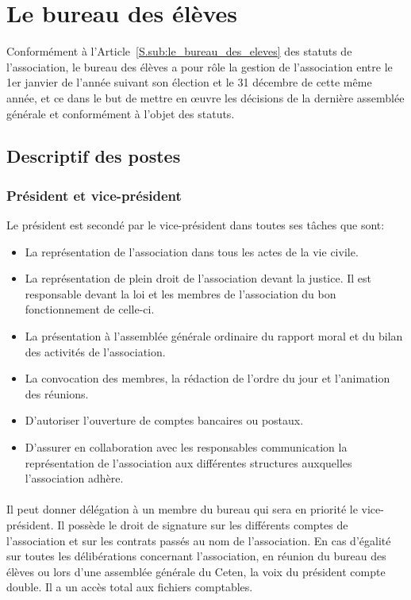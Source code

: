 \documentclass{article} %
\begin{document}
	\section{Le bureau des élèves}
\label{sec:le_bureau_des_eleves}

			Conformément à l’Article~\ref{S.sub:le_bureau_des_eleves} des
			statuts de l’association, le bureau des élèves a pour rôle la
			gestion de l'association entre le 1er janvier de l’année suivant
			son élection et le 31 décembre de cette même année, et ce dans le
			but de mettre en œuvre les décisions de la dernière assemblée
			générale et conformément à l'objet des statuts.

		\subsection{Descriptif des postes}
\label{sub:descriptif_des_postes}

			\subsubsection{Président et vice-président}
\label{ssub:president_et_vice_president}

				Le président est secondé par le vice-président dans toutes ses
				tâches que sont:
				\begin{itemize}
					\item La représentation de l’association dans tous les actes
						de la vie civile.
					\item La représentation de plein droit de l’association
						devant la justice. Il est responsable devant la loi et
						les membres de l’association du bon fonctionnement de
						celle-ci.
					\item La présentation à l’assemblée générale
						ordinaire du rapport moral et du bilan des activités de
						l’association.
					\item La convocation des membres, la rédaction de l’ordre du
						jour et l’animation des réunions.
					\item D’autoriser l’ouverture de comptes bancaires ou
						postaux.
					\item D’assurer en collaboration avec les responsables
						communication la représentation de l’association aux
						différentes structures auxquelles l’association adhère. 
				\end{itemize}

               \paragraph{}
				Il peut donner délégation à un membre du bureau qui sera en
				priorité le vice-président. Il possède le droit de signature sur
				les différents comptes de l'association et sur les contrats
				passés au nom de l’association. En cas d’égalité sur toutes les
				délibérations concernant l’association, en réunion du bureau des
				élèves ou lors d’une assemblée générale du Ceten, la voix du
				président compte double. Il a un accès total aux fichiers
				comptables.
\end{document}
